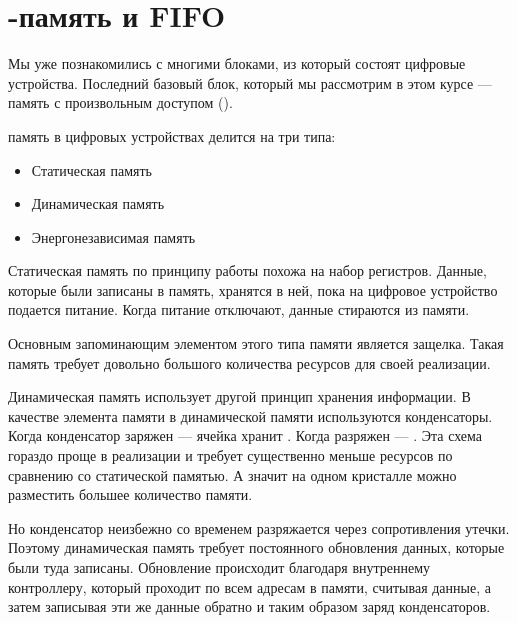\chapter{-память и FIFO} 

\par{Мы уже познакомились с многими блоками, из который состоят цифровые устройства. Последний базовый  блок, который мы рассмотрим в этом курсе — память с произвольным доступом ().}

\vspace{4mm}

\par{ память в цифровых устройствах делится на три типа:}
  \begin{itemize}%
    \item Статическая память
    \item Динамическая память
    \item Энергонезависимая память
  \end{itemize}

\par{Статическая память по принципу работы похожа на набор регистров. Данные, которые были записаны в память, хранятся в ней, пока на цифровое устройство подается питание. Когда питание отключают, данные стираются из памяти.}

\par{Основным запоминающим элементом этого типа памяти является защелка. Такая память требует довольно большого количества ресурсов для своей реализации.}

\vspace{4mm}

\par{Динамическая память использует другой принцип хранения информации. В качестве элемента памяти в динамической памяти используются конденсаторы. Когда конденсатор заряжен — ячейка хранит . Когда разряжен — . Эта схема гораздо проще в реализации и требует существенно меньше ресурсов по сравнению со статической памятью. А значит на одном кристалле можно разместить большее количество памяти.}

\par{Но конденсатор неизбежно со временем разряжается через сопротивления утечки. Поэтому динамическая память требует постоянного обновления данных, которые были туда записаны. Обновление происходит благодаря внутреннему контроллеру, который проходит по всем адресам в памяти, считывая данные, а затем записывая эти же данные обратно и таким образом  заряд конденсаторов.}

